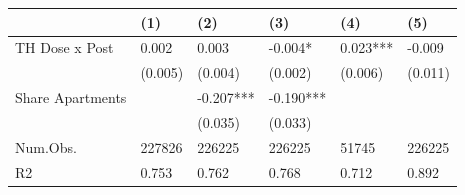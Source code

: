 \begin{tabular}{llllll}
\hline
& (1) & (2) & (3) & (4) & (5) \\ \hline
TH Dose x Post & 0.002 & 0.003 & -0.004* & 0.023*** & -0.009 \\
& (0.005) & (0.004) & (0.002) & (0.006) & (0.011) \\
Share Apartments &  & -0.207*** & -0.190*** &  &  \\
&  & (0.035) & (0.033) &  &  \\
Num.Obs. & 227826 & 226225 & 226225 & 51745 & 226225 \\
R2 & 0.753 & 0.762 & 0.768 & 0.712 & 0.892 \\
\hline
\end{tabular}
